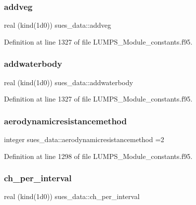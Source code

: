 \subsubsection{\texorpdfstring{addveg}{addveg}}
{\footnotesize\ttfamily real (kind(1d0)) sues\+\_\+data\+::addveg}



Definition at line 1327 of file L\+U\+M\+P\+S\+\_\+\+Module\+\_\+constants.\+f95.

\mbox{\label{namespacesues__data_aa314ccdf6d41a3901fa922504f030203}} 
\subsubsection{\texorpdfstring{addwaterbody}{addwaterbody}}
{\footnotesize\ttfamily real (kind(1d0)) sues\+\_\+data\+::addwaterbody}



Definition at line 1327 of file L\+U\+M\+P\+S\+\_\+\+Module\+\_\+constants.\+f95.

\mbox{\label{namespacesues__data_a1780a57f30571faa7263e9cd248a8dd0}} 
\subsubsection{\texorpdfstring{aerodynamicresistancemethod}{aerodynamicresistancemethod}}
{\footnotesize\ttfamily integer sues\+\_\+data\+::aerodynamicresistancemethod =2}



Definition at line 1298 of file L\+U\+M\+P\+S\+\_\+\+Module\+\_\+constants.\+f95.

\mbox{\label{namespacesues__data_a79ed0c9098d69fcbc6ad9a95fddaf013}} 
\subsubsection{\texorpdfstring{ch\+\_\+per\+\_\+interval}{ch\_per\_interval}}
{\footnotesize\ttfamily real (kind(1d0)) sues\+\_\+data\+::ch\+\_\+per\+\_\+interval}



